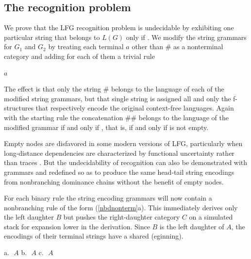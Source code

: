 \documentclass[output=paper,hidelinks]{langscibook}
\begin{document}
\subsection{The recognition problem}
We prove that the LFG recognition problem is undecidable by exhibiting one particular string that belongs to \mbox{$L(G)$} only if . We modify the string grammars for \mbox{$G_1$} and \mbox{$G_2$}   by treating each terminal $a$ other than \# as a nonterminal category and adding for each of them a trivial rule 

\ea\label{stringterm2}
$a$ \rarrow\ \estring
\z

\noindent The effect is that only the string \# belongs to the language of each of the modified string grammars, but that single string is assigned all and only the f-structures that respectively encode the original context-free languages.   Again with the starting rule  the concatenation \#\# belongs to the language of the modified grammar if and only if ,  that is, if and only if \ParG{\#\#} is not empty.

Empty nodes are disfavored in some modern versions of LFG, particularly when long-distance dependencies are characterized by functional uncertainty rather than traces \citep{kaplzaen89, Dalrympleetal2015}. But the undecidability of recognition can also be demonstrated with grammars  and  redefined so as to produce the same head-tail string encodings from nonbranching dominance chains without the benefit of empty nodes.

For each binary rule  the string encoding grammars will now contain a nonbranching rule of the form (\ref{nbdnonterm}a).  This immediately derives only the left daughter $B$ but pushes the right-daughter category $C$ on a simulated stack for expansion lower in the derivation. Since $B$ is the left daughter of $A$, the encodings of their terminal strings have a shared (eginning). 

\ea\label{nbdnonterm}
\hsp{-.25em}a.\ \,{\small $A$ \rarrow \hsp{-.5em}}
\hsp{-.5em}
b.\ \,{\small $A$ \rarrow \hsp{-.5em}
	                                                }
\hsp{-.5em}
c.\ \,{\small $A$ \rarrow\hsp{-.5em}}
\z
\end{document}
